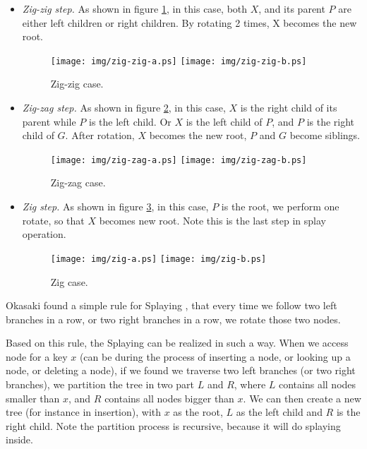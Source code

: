 \documentclass{article}
\begin{document}
\begin{itemize}
\item {\em Zig-zig step.} As shown in figure \ref{fig:zig-zig}, in this case,
both $X$, and its parent $P$ are either left children or right children. By
rotating 2 times, X becomes the new root.
 
\begin{figure}[htbp]
   \begin{center}
   	  \texttt{[image: img/zig-zig-a.ps]} 
          \texttt{[image: img/zig-zig-b.ps]}
          \caption{Zig-zig case.} \label{fig:zig-zig}
   \end{center}
\end{figure}

\item {\em Zig-zag step.} As shown in figure \ref{fig:zig-zag}, in this
case, $X$ is the right child of its parent while $P$ is the left child.
Or $X$ is the left child of $P$, and $P$ is the right child of $G$.
After rotation, $X$ becomes the new root, $P$ and $G$ become siblings.

\begin{figure}[htbp]
   \begin{center}
   	  \texttt{[image: img/zig-zag-a.ps]}
          \texttt{[image: img/zig-zag-b.ps]}
          \caption{Zig-zag case.} \label{fig:zig-zag}
   \end{center}
\end{figure}

\item {\em Zig step.} As shown in figure \ref{fig:zig}, in this case,
$P$ is the root, we perform one rotate, so that $X$ becomes new root.
Note this is the last step in splay operation.

\begin{figure}[htbp]
   \begin{center}
   	  \texttt{[image: img/zig-a.ps]}
          \texttt{[image: img/zig-b.ps]}
          \caption{Zig case.} \label{fig:zig}
   \end{center}
\end{figure}

\end{itemize}

Okasaki found a simple rule for Splaying \cite{okasaki-book}, 
that every time we follow
two left branches in a row, or two right branches in a row, we rotate
those two nodes.

Based on this rule, the Splaying can be realized in such a way.
When we access node for a key $x$ (can be during the process of 
inserting a node, or looking up a node, or deleting a node), if
we found we traverse two left branches (or two right branches), we
partition the tree in two part $L$ and $R$, where $L$ contains all
nodes smaller than $x$, and $R$ contains all nodes bigger than $x$.
We can then create a new tree (for instance in insertion), 
with $x$ as the root, $L$ as the left child and $R$ is the right child.
Note the partition process is recursive, because it will do splaying
inside.
\end{document}
